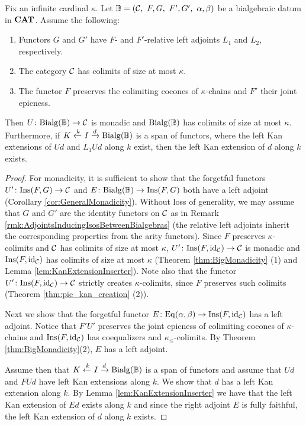 \begin{theorem}\label{thm:BigMonadicityB}
    Fix an infinite cardinal $\kappa$. Let $\mathbb{B} = (\mathcal{C},\ F,G,\ F',G',\ \alpha, \beta)$ be a bialgebraic datum in $\mathbf{CAT}$. Assume the following:
    \begin{enumerate}
        \item Functors $G$ and $G'$ have $F$- and $F'$-relative left adjoints $L_1$ and $L_2$, respectively.
        \item The category $\mathcal{C}$ has colimits of size at most $\kappa$.
        \item The functor $F$ preserves the colimiting cocones of $\kappa$-chains and $F'$ their joint epicness.
    \end{enumerate}
    Then $U\colon \mathrm{Bialg}(\mathbb{B})\to \mathcal{C}$ is monadic and $\mathrm{Bialg}(\mathbb{B})$ has colimits of size at most $\kappa$. Furthermore, if $K\xleftarrow{k} I\xrightarrow{d}\mathrm{Bialg}(\mathbb{B})$ is a span of functors, where the left Kan extensions of $Ud$ and $L_1Ud$ along $k$ exist, then the left Kan extension of $d$ along $k$ exists.
\end{theorem}
\begin{proof}
    For monadicity, it is sufficient to show that the forgetful functors $U'\colon \mathrm{Ins}(F,G)\to \mathcal{C}$ and $E\colon \mathrm{Bialg}(\mathbb{B})\to \mathrm{Ins}(F,G)$ both have a left adjoint (Corollary \ref{cor:GeneralMonadicity}). Without loss of generality, we may assume that $G$ and $G'$ are the identity functors on $\mathcal{C}$ as in Remark \ref{rmk:AdjointsInducingIsosBetweenBialgebras} (the relative left adjoints inherit the corresponding properties from the arity functors). Since $F$ preserves $\kappa$-colimits and $\mathcal{C}$ has colimits of size at most $\kappa$, $U'\colon \mathrm{Ins}(F,\mathrm{id}_{\mathcal{C}})\to \mathcal{C}$ is monadic and $\mathrm{Ins}(F,\mathrm{id}_{\mathcal{C}})$ has colimits of size at most $\kappa$ (Theorem \ref{thm:BigMonadicity} (1) and Lemma \ref{lem:KanExtensionInserter}). Note also that the functor $U'\colon \mathrm{Ins}(F,\mathrm{id}_{\mathcal{C}})\to \mathcal{C}$ strictly creates $\kappa$-colimits, since $F$ preserves such colimits (Theorem \ref{thm:pie_kan_creation} (2)).

    Next we show that the forgetful functor $E\colon \mathrm{Eq}(\alpha,\beta)\to \mathrm{Ins}(F,\mathrm{id}_{\mathcal{C}})$ has a left adjoint. Notice that $F'U'$ preserves the joint epicness of colimiting cocones of $\kappa$-chains and $\mathrm{Ins}(F,\mathrm{id}_{\mathcal{C}})$ has coequalizers and $\kappa_\leq$-colimits. By Theorem \ref{thm:BigMonadicity}(2), $E$ has a left adjoint. 

    Assume then that $K\xleftarrow{k} I\xrightarrow{d} \mathrm{Bialg}(\mathbb{B})$ is a span of functors and assume that $Ud$ and $FUd$ have left Kan extensions along $k$. We show that $d$ has a left Kan extension along $k$. By Lemma \ref{lem:KanExtensionInserter} we have that the left Kan extension of $Ed$ exists along $k$ and since the right adjoint $E$ is fully faithful, the left Kan extension of $d$ along $k$ exists.
\end{proof}


